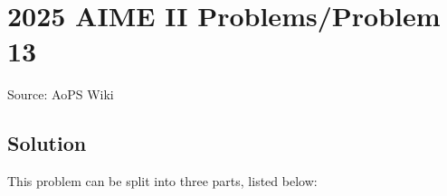 \documentclass[12pt]{article}
\begin{document}
\section*{{2025 AIME II Problems/Problem 13}}
Source: AoPS Wiki

\subsection*{Solution}
This problem can be split into three parts, listed below:
\end{document}
